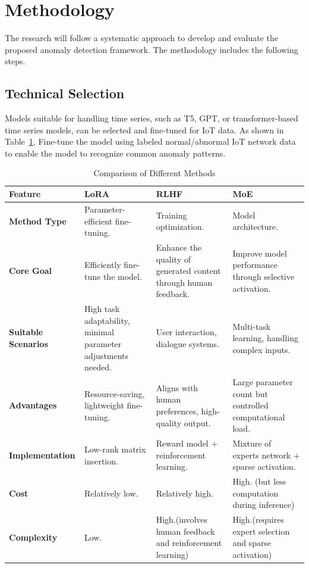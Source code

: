 \documentclass[usenatbib]{tjaa}
\begin{document}

\section{Methodology}
The research will follow a systematic approach to develop and evaluate
the proposed anomaly detection framework.
The methodology includes the following steps.

\subsection{Technical Selection}

Models suitable for handling time series, such as T5, GPT,
or transformer-based time series models,
can be selected and fine-tuned for IoT data.
As shown in Table~\ref{tab:comparison}, Fine-tune the model using labeled normal/abnormal
IoT network data to enable the model to recognize common anomaly patterns.

\begin{table}
  \centering
  \caption{Comparison of Different Methods}
  \label{tab:comparison}
  \begin{tabularx}{\textwidth}{>{\raggedright\arraybackslash}p{2.5cm} X X X}
      \toprule
      \textbf{Feature} & \textbf{LoRA} & \textbf{RLHF} & \textbf{MoE} \\
      \midrule
      \textbf{Method Type} & Parameter-efficient fine-tuning. & Training optimization. & Model architecture. \\
      \textbf{Core Goal} & Efficiently fine-tune the model. & Enhance the quality of generated content through human feedback. & Improve model performance through selective activation. \\
      \textbf{Suitable Scenarios} & High task adaptability, minimal parameter adjustments needed. & User interaction, dialogue systems. & Multi-task learning, handling complex inputs. \\
      \textbf{Advantages} & Resource-saving, lightweight fine-tuning. & Aligns with human preferences, high-quality output. & Large parameter count but controlled computational load. \\
      \textbf{Implementation} & Low-rank matrix insertion. & Reward model + reinforcement learning. & Mixture of experts network + sparse activation. \\
      \textbf{Cost} & Relatively low. & Relatively high. & High. (but less computation during inference) \\
      \textbf{Complexity} & Low. & High.(involves human feedback and reinforcement learning) & High.(requires expert selection and sparse activation) \\
      \bottomrule
  \end{tabularx}
\end{table}
\end{document}
